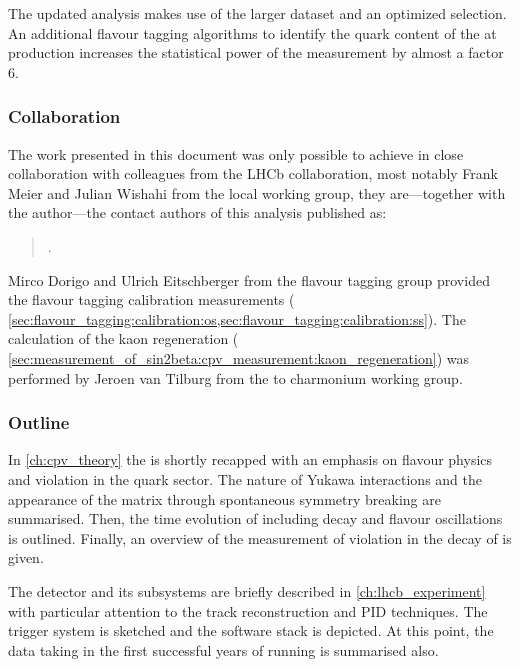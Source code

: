 The updated analysis makes use of the larger dataset and an optimized selection.
An additional flavour tagging algorithms to identify the quark content of the
\Bmeson at production increases the statistical power of the measurement by
almost a factor $\num{6}$.

\subsubsection*{Collaboration}
The work presented in this document was only possible to achieve in close
collaboration with colleagues from the \acs{LHCb} collaboration, most notably
Frank Meier and Julian Wishahi from the local working group, they are---together
with the author---the contact authors of this analysis published as:
%
\begin{quotation}
  .
\end{quotation}

Mirco Dorigo and Ulrich Eitschberger from the flavour tagging group provided the
flavour tagging calibration measurements (\cf
\cref{sec:flavour_tagging:calibration:os,sec:flavour_tagging:calibration:ss}).
The calculation of the kaon regeneration (\cf
\cref{sec:measurement_of_sin2beta:cpv_measurement:kaon_regeneration}) was
performed by Jeroen van Tilburg from the \B to charmonium working group.

\subsubsection*{Outline}

In \cref{ch:cpv_theory} the \SM is shortly recapped with an emphasis on flavour
physics and \CP violation in the quark sector. The nature of Yukawa
interactions and the appearance of the \CKM matrix through spontaneous symmetry
breaking are summarised. Then, the time evolution of \Bmesons including decay
and flavour oscillations is outlined. Finally, an overview of the measurement of
\CP violation in the decay of \BdToJpsiKS is given.

The \LHCb detector and its subsystems are briefly described in
\cref{ch:lhcb_experiment} with particular attention to the track reconstruction
and \acl{PID} techniques. The \LHCb trigger system is sketched and the software
stack is depicted. At this point, the data taking in the first successful years
of running is summarised also.

